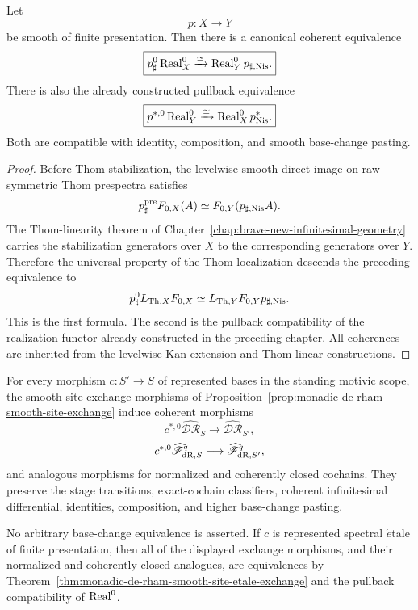 \begin{proposition}
\label{prop:monadic-de-rham-realization-smooth-direct-image}
Let
\[
    p:X\longrightarrow Y
\]
be smooth of finite presentation.  Then there is a canonical coherent
equivalence
\[
\boxed{
    p_\sharp^0\operatorname{Real}^{0}_X
    \xrightarrow{\simeq}
    \operatorname{Real}^{0}_Yp_{\sharp,\mathrm{Nis}}.
}
\]
There is also the already constructed pullback equivalence
\[
\boxed{
    p^{*,0}\operatorname{Real}^{0}_Y
    \xrightarrow{\simeq}
    \operatorname{Real}^{0}_Xp^*_{\mathrm{Nis}}.
}
\]
Both are compatible with identity, composition, and smooth base-change
pasting.
\end{proposition}

\begin{proof}
Before Thom stabilization, the levelwise smooth direct image on raw symmetric
Thom prespectra satisfies
\[
    p_\sharp^{\mathrm{pre}}F_{0,X}(A)
    \simeq
    F_{0,Y}(p_{\sharp,\mathrm{Nis}}A).
\]
The Thom-linearity theorem of
Chapter~\ref{chap:brave-new-infinitesimal-geometry} carries the stabilization
generators over \(X\) to the corresponding generators over \(Y\).  Therefore
the universal property of the Thom localization descends the preceding
equivalence to
\[
    p_\sharp^0L_{\mathrm{Th},X}F_{0,X}
    \simeq
    L_{\mathrm{Th},Y}F_{0,Y}p_{\sharp,\mathrm{Nis}}.
\]
This is the first formula.  The second is the pullback compatibility of the
realization functor already constructed in the preceding chapter.  All
coherences are inherited from the levelwise Kan-extension and Thom-linear
constructions.
\end{proof}

\begin{corollary}
\label{cor:monadic-de-rham-realized-base-change-exchange}
For every morphism \(c:S'\to S\) of represented bases in the standing
motivic scope, the smooth-site exchange morphisms of
Proposition~\ref{prop:monadic-de-rham-smooth-site-exchange} induce coherent
morphisms
\[
    c^{*,0}\widehat{\mathscr{DR}}_S
    \longrightarrow
    \widehat{\mathscr{DR}}_{S'},
\]
\[
    c^{*,0}\widehat{\mathscr F}_{\mathrm{dR},S}^{q}
    \longrightarrow
    \widehat{\mathscr F}_{\mathrm{dR},S'}^{q},
\]
and analogous morphisms for normalized and coherently closed cochains.
They preserve the stage transitions, exact-cochain classifiers, coherent
infinitesimal differential, identities, composition, and higher base-change
pasting.

No arbitrary base-change equivalence is asserted.  If \(c\) is represented
spectral \(\acute{e}\)tale of finite presentation, then all of the displayed
exchange morphisms, and their normalized and coherently closed analogues, are
equivalences by
Theorem~\ref{thm:monadic-de-rham-smooth-site-etale-exchange} and the pullback
compatibility of \(\operatorname{Real}^{0}\).
\end{corollary}




